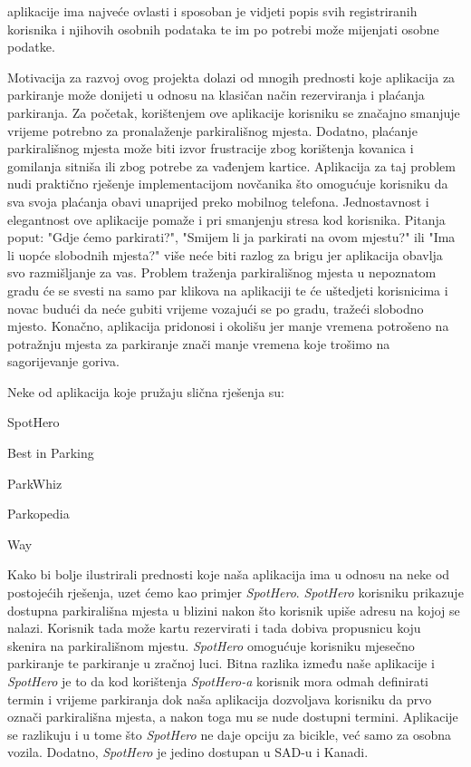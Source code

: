 		
		 aplikacije ima najveće ovlasti i sposoban je vidjeti popis svih registriranih korisnika i njihovih osobnih podataka te im po potrebi može mijenjati osobne podatke.
		
		Motivacija za razvoj ovog projekta dolazi od mnogih prednosti koje aplikacija za parkiranje može donijeti u odnosu na klasičan način rezerviranja i plaćanja parkiranja. Za početak, korištenjem ove aplikacije korisniku se značajno smanjuje vrijeme potrebno za pronalaženje parkirališnog mjesta. Dodatno, plaćanje parkirališnog mjesta može biti izvor frustracije zbog korištenja kovanica i gomilanja sitniša ili zbog potrebe za vađenjem kartice. Aplikacija za taj problem nudi praktično rješenje implementacijom novčanika što omogućuje korisniku da sva svoja plaćanja obavi unaprijed preko mobilnog telefona. Jednostavnost i elegantnost ove aplikacije pomaže i pri smanjenju stresa kod korisnika. Pitanja poput: "Gdje ćemo parkirati?", "Smijem li ja parkirati na ovom mjestu?" ili "Ima li uopće slobodnih mjesta?" više neće biti razlog za brigu jer aplikacija obavlja svo razmišljanje za vas. Problem traženja parkirališnog mjesta u nepoznatom gradu će se svesti na samo par klikova na aplikaciji te će uštedjeti korisnicima i novac budući da neće gubiti vrijeme vozajući se po gradu, tražeći slobodno mjesto. Konačno, aplikacija pridonosi i okolišu jer manje vremena potrošeno na potražnju mjesta za parkiranje znači manje vremena koje trošimo na sagorijevanje goriva.
		
		Neke od aplikacija koje pružaju slična rješenja su:
		\begin{packed_item}
			\item SpotHero
			\item Best in Parking
			\item ParkWhiz
			\item Parkopedia
			\item Way
		\end{packed_item}
		
		Kako bi bolje ilustrirali prednosti koje naša aplikacija ima u odnosu na neke od postojećih rješenja, uzet ćemo kao primjer \textit {SpotHero}. \textit {SpotHero} korisniku prikazuje dostupna parkirališna mjesta u blizini nakon što korisnik upiše adresu na kojoj se nalazi. Korisnik tada može kartu rezervirati i tada dobiva propusnicu koju skenira na parkirališnom mjestu. \textit {SpotHero} omogućuje korisniku mjesečno parkiranje te parkiranje u zračnoj luci. Bitna razlika između naše aplikacije i \textit {SpotHero} je to da kod korištenja \textit {SpotHero-a} korisnik mora odmah definirati termin i vrijeme parkiranja dok naša aplikacija dozvoljava korisniku da prvo označi parkirališna mjesta, a nakon toga mu se nude dostupni termini. Aplikacije se razlikuju i u tome što \textit {SpotHero} ne daje opciju za bicikle, već samo za osobna vozila. Dodatno, \textit {SpotHero} je jedino dostupan u SAD-u i Kanadi.
		

